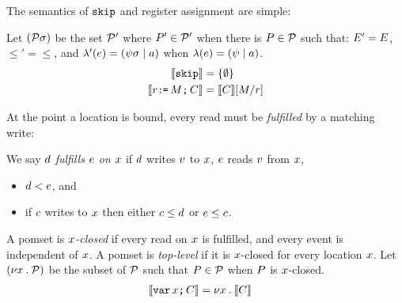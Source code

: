 The semantics of $\texttt{skip}$ and register assignment are simple:
\begin{definition}
Let $(\mathcal{P}\sigma)$ be the set $\mathcal{P}'$ where $P'\in\mathcal{P}'$ when
there is $P\in\mathcal{P}$ such that:
$E' = E$,
${\le'} = {\le}$, 
and
$\lambda'(e) = (\psi\sigma \mid a)$ when $\lambda(e) = (\psi \mid a)$.
\begin{align*}
  \llbracket\texttt{skip}\rrbracket & =
  \{ \emptyset \}
  \\  
  \llbracket r\texttt{:}\mkern-1mu\texttt{=}\,M\texttt{;}\,\allowbreak C\rrbracket & =
  \llbracket C\rrbracket[M/r] 
\end{align*}
\end{definition}

At the point a location is bound, every read must be \emph{fulfilled} by a
matching write:

\begin{definition}
  \label{def:rf}
  We say $d$ \emph{fulfills $e$ on $x$} if $d$ \externally writes
  $v$ to $x$, $e$ \externally reads $v$ from $x$,
  \begin{itemize}
  \item
    $d < e$, and
  \item
    if $c$ \externally writes to $x$ then either $c \leq d$ or $e \leq c$.
  \end{itemize}

  A pomset is \emph{$x$-closed} if every \external read on $x$ is fulfilled,
  and every event is independent of $x$.
  A pomset is \emph{top-level} if it is $x$-closed for every location $x$.
  Let $(\nu x\mathbin.\mathcal{P})$ be the subset of $\mathcal{P}$ such that $P\in\mathcal{P}$
  when $P$ is $x$-closed.
\begin{align*}
  \llbracket\texttt{var}\,x\texttt{;}\,\allowbreak C\rrbracket & =
  \nu x \mathbin. \llbracket C\rrbracket  
\end{align*}
\end{definition}


